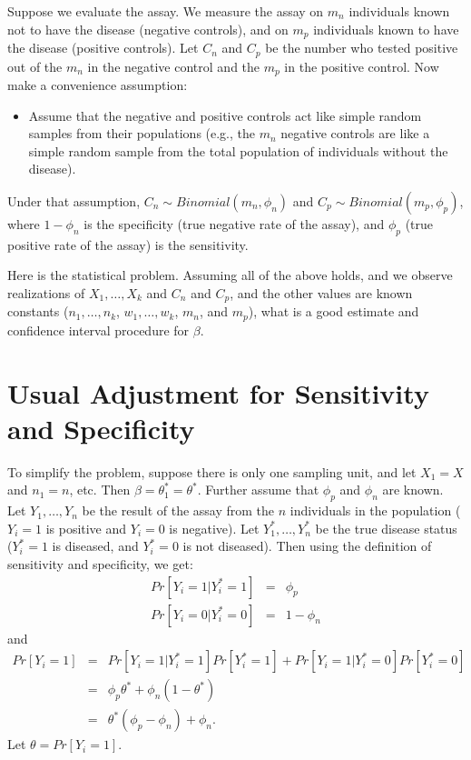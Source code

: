 \documentclass{article}
\begin{document}
Suppose we evaluate the assay. We measure the assay on $m_n$ individuals known not to have the disease (negative controls), and on $m_p$ individuals known to have the disease (positive controls). Let $C_n$ and $C_p$ be the number who tested positive out of the $m_n$ in the negative control and the $m_p$  in the positive control. Now make a convenience assumption:
\begin{itemize}
\item Assume that the negative and positive controls act like simple random samples from their populations (e.g., the $m_n$ negative controls are like a simple random sample from the total population of individuals without the disease).
\end{itemize}
Under that assumption, $C_n \sim Binomial(m_n, \phi_n)$ and $C_p \sim Binomial(m_p, \phi_p)$,
where $1-\phi_n$ is the specificity (true negative rate of the assay),
and $\phi_p$ (true positive rate of the assay) is the sensitivity.

Here is the statistical problem. Assuming all of the above holds, and we observe realizations of $X_1,\ldots, X_k$ and $C_n$ and $C_p$, and the other values are known constants ($n_1,\ldots, n_k$, $w_1,\ldots, w_k$,  $m_n$, and $m_p$), what is a good estimate and confidence interval procedure for $\beta$.


\section{Usual Adjustment for Sensitivity and Specificity}
\label{sec-usualAdj}

To simplify the problem, suppose there is only one sampling unit, and let $X_1=X$ and $n_1=n$, etc. Then $\beta = \theta_1^*=\theta^*$.
Further assume that $\phi_p$ and $\phi_n$ are known. Let $Y_1,\ldots,Y_n$ be the result of the assay from the $n$ individuals in the population
($Y_i=1$ is positive and $Y_i=0$ is negative). Let $Y_1^*,\ldots,Y_n^*$ be the true disease status ($Y_i^*=1$ is diseased, and $Y_i^*=0$ is not diseased).
Then using the definition of sensitivity and specificity, we get:
\begin{eqnarray*}
Pr[ Y_i =1 | Y_i^*=1] & = & \phi_p \\
Pr[ Y_i=0 | Y_i^*=0] & = & 1- \phi_n
\end{eqnarray*}
and
\begin{eqnarray*}
Pr[ Y_i=1] & = & Pr[ Y_i =1 | Y_i^*=1]  Pr[Y_i^*=1] + Pr[ Y_i =1 | Y_i^*=0] Pr[ Y_i^*=0] \\
& = & \phi_p \theta^* + \phi_n (1-\theta^*)  \\
& = & \theta^* (\phi_p - \phi_n) + \phi_n.
\end{eqnarray*}
Let $\theta = Pr[ Y_i=1]$.
\end{document}
